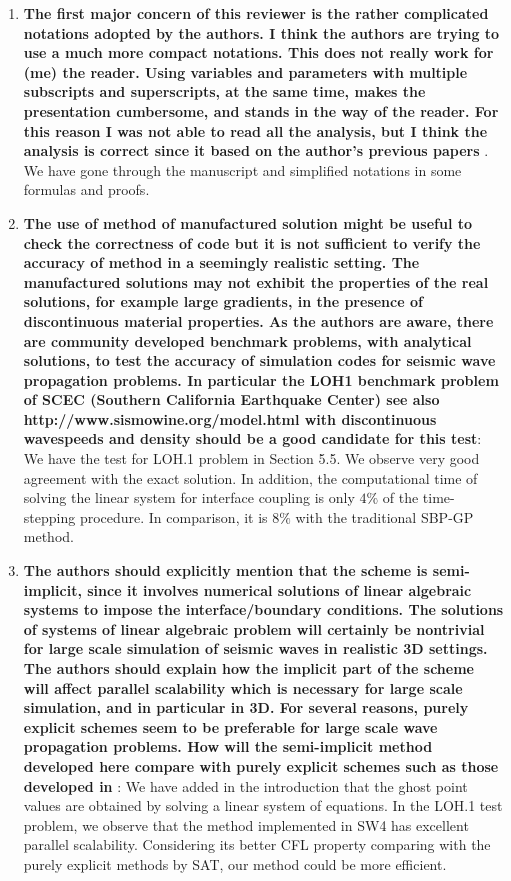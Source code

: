 \documentclass[twoside,11pt]{article}
\begin{document}
\begin{enumerate}
\item \textbf{The first major concern of this reviewer is the rather complicated notations adopted by the authors. I think the authors are trying to use a much more compact notations. This does not really work for (me) the reader. Using variables and parameters with multiple subscripts and superscripts, at the same time, makes the presentation cumbersome, and stands in the way of the reader. For this reason I was not able to read all the analysis, but I think the analysis is correct since it based on the author’s previous papers} \cite{petersson2009stable,wang2019fourth,petersson2015wave}.\\
 We have gone through the manuscript and simplified notations in some formulas and proofs.

\item  \textbf{The use of method of manufactured solution might be useful to check the correctness of code but it is not sufficient to verify the accuracy of method in a seemingly realistic setting. The manufactured solutions may not exhibit the properties of the real solutions, for example large gradients, in the presence of discontinuous material properties. As the authors are aware, there are community developed benchmark problems, with analytical solutions, to test the accuracy of simulation codes for seismic wave propagation problems. In particular the LOH1 benchmark problem of SCEC (Southern California Earthquake Center) see also http://www.sismowine.org/model.html with discontinuous wavespeeds and density should be a good candidate for this test}: We have the test for LOH.1 problem in Section 5.5. We observe very good agreement with the exact solution. In addition, the computational time of solving the linear system for interface coupling is only $4\%$ of the time-stepping procedure. In comparison, it is $8\%$ with the traditional SBP-GP method.

\item  \textbf{The authors should explicitly mention that the scheme is semi-implicit, since it involves numerical solutions of linear algebraic systems to impose the interface/boundary conditions. The solutions of systems of linear algebraic problem will certainly be nontrivial for large scale simulation of seismic waves in realistic 3D settings. The authors should explain how the implicit part of the scheme will affect parallel scalability which is necessary for large scale simulation, and in particular in 3D. For several reasons, purely explicit schemes seem to be preferable for large scale wave propagation problems. How will the semi-implicit method developed here compare with purely explicit schemes such as those developed in} \cite{virta2014acoustic,duru2014stable}: We have added in the introduction that the ghost point values are obtained by solving a linear system of equations. In the LOH.1 test problem, we observe that the method implemented in SW4 has excellent parallel scalability. Considering its better CFL property comparing with the purely explicit methods by SAT, our method could be more efficient. 


\end{enumerate}
\end{document}
